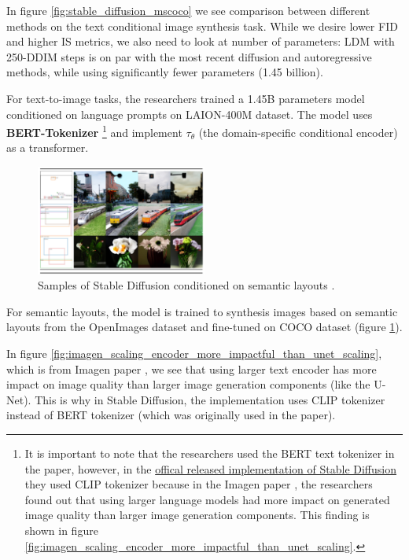 In figure \ref{fig:stable_diffusion_mscoco} we see comparison between different methods on the text conditional image synthesis task. While we desire lower FID and higher IS metrics, we also need to look at number of parameters: LDM with 250-DDIM steps is on par with the most recent diffusion and autoregressive methods, while using significantly fewer parameters (1.45 billion).

For text-to-image tasks, the researchers trained a 1.45B parameters model conditioned on language prompts on LAION-400M dataset. The model uses \textbf{BERT-Tokenizer} \footnote{It is important to note that the researchers used the BERT text tokenizer in the paper, however, in the \href{https://github.com/CompVis/latent-diffusion}{offical released implementation of Stable Diffusion} they used CLIP tokenizer because in the Imagen paper \cite{imagen}, the researchers found out that using larger language models had more impact on generated image quality than larger image generation components. This finding is shown in figure \ref{fig:imagen_scaling_encoder_more_impactful_than_unet_scaling}.} \cite{bert} and implement $\tau_\theta$ (the domain-specific conditional encoder) as a transformer.

\begin{figure}
    \centering
    \includegraphics[width=0.5\textwidth]{images/diffusion_models/stable_diffusion/experiments_3.png}
    \caption{Samples of Stable Diffusion conditioned on semantic layouts \cite{stable_diffusion}.}
    \label{fig:stable_diffusion_experiments_semantic_layouts}
\end{figure}

For semantic layouts, the model is trained to synthesis images based on semantic layouts from the OpenImages dataset and fine-tuned on COCO dataset (figure \ref{fig:stable_diffusion_experiments_semantic_layouts}).

In figure \ref{fig:imagen_scaling_encoder_more_impactful_than_unet_scaling}, which is from Imagen paper \cite{imagen}, we see that using larger text encoder has more impact on image quality than larger image generation components (like the U-Net). This is why in Stable Diffusion, the implementation uses CLIP tokenizer instead of BERT tokenizer (which was originally used in the paper).

